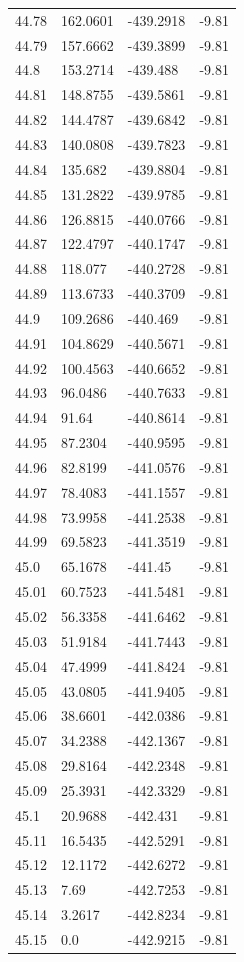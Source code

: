 \begin{table}[H]
\begin{tabular}{llll}
44.78 & 162.0601 & -439.2918 & -9.81 \\
44.79 & 157.6662 & -439.3899 & -9.81 \\
44.8 & 153.2714 & -439.488 & -9.81 \\
44.81 & 148.8755 & -439.5861 & -9.81 \\
44.82 & 144.4787 & -439.6842 & -9.81 \\
44.83 & 140.0808 & -439.7823 & -9.81 \\
44.84 & 135.682 & -439.8804 & -9.81 \\
44.85 & 131.2822 & -439.9785 & -9.81 \\
44.86 & 126.8815 & -440.0766 & -9.81 \\
44.87 & 122.4797 & -440.1747 & -9.81 \\
44.88 & 118.077 & -440.2728 & -9.81 \\
44.89 & 113.6733 & -440.3709 & -9.81 \\
44.9 & 109.2686 & -440.469 & -9.81 \\
44.91 & 104.8629 & -440.5671 & -9.81 \\
44.92 & 100.4563 & -440.6652 & -9.81 \\
44.93 & 96.0486 & -440.7633 & -9.81 \\
44.94 & 91.64 & -440.8614 & -9.81 \\
44.95 & 87.2304 & -440.9595 & -9.81 \\
44.96 & 82.8199 & -441.0576 & -9.81 \\
44.97 & 78.4083 & -441.1557 & -9.81 \\
44.98 & 73.9958 & -441.2538 & -9.81 \\
44.99 & 69.5823 & -441.3519 & -9.81 \\
45.0 & 65.1678 & -441.45 & -9.81 \\
45.01 & 60.7523 & -441.5481 & -9.81 \\
45.02 & 56.3358 & -441.6462 & -9.81 \\
45.03 & 51.9184 & -441.7443 & -9.81 \\
45.04 & 47.4999 & -441.8424 & -9.81 \\
45.05 & 43.0805 & -441.9405 & -9.81 \\
45.06 & 38.6601 & -442.0386 & -9.81 \\
45.07 & 34.2388 & -442.1367 & -9.81 \\
45.08 & 29.8164 & -442.2348 & -9.81 \\
45.09 & 25.3931 & -442.3329 & -9.81 \\
45.1 & 20.9688 & -442.431 & -9.81 \\
45.11 & 16.5435 & -442.5291 & -9.81 \\
45.12 & 12.1172 & -442.6272 & -9.81 \\
45.13 & 7.69 & -442.7253 & -9.81 \\
45.14 & 3.2617 & -442.8234 & -9.81 \\
45.15 & 0.0 & -442.9215 & -9.81 \\
\bottomrule
\end{tabular}

\end{table}
